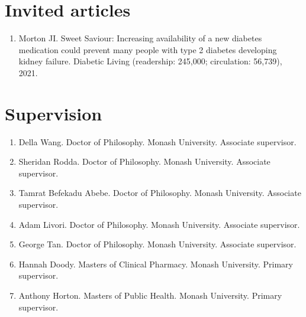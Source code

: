 \documentclass[11pt]{article}
\begin{document}
\section*{Invited articles}
\begin{enumerate}
\item Morton JI. Sweet Saviour: Increasing availability of a new diabetes medication could prevent many people with 
type 2 diabetes developing kidney failure. Diabetic Living (readership: 245,000; circulation: 56,739), 2021. 
\end{enumerate}


\section*{Supervision}
\begin{enumerate}
\item Della Wang. Doctor of Philosophy. Monash University. Associate supervisor. 
\item Sheridan Rodda. Doctor of Philosophy. Monash University. Associate supervisor. 
\item Tamrat Befekadu Abebe. Doctor of Philosophy. Monash University. Associate supervisor. 
\item Adam Livori. Doctor of Philosophy. Monash University. Associate supervisor. 
\item George Tan. Doctor of Philosophy. Monash University. Associate supervisor. 
\item Hannah Doody. Masters of Clinical Pharmacy. Monash University. Primary supervisor. 
\item Anthony Horton. Masters of Public Health. Monash University. Primary supervisor.
\end{enumerate}
\end{document}
